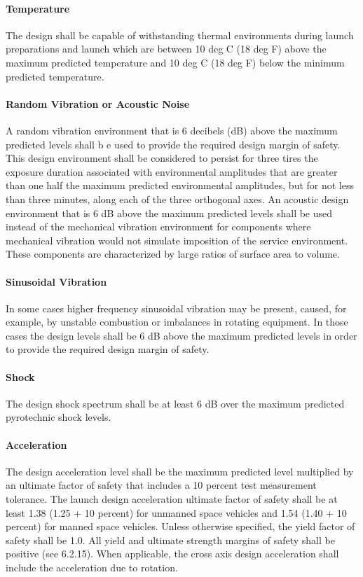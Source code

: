\documentclass[12pt]{article}
\begin{document}
\paragraph{Temperature} %
The design shall be capable of withstanding thermal environments during launch preparations and launch which are between 10 deg C (18 deg F) above the maximum predicted temperature and 10 deg C (18 deg F) below the minimum predicted temperature.

\paragraph{Random Vibration or Acoustic Noise} %
A random vibration environment that is 6 decibels (dB) above the maximum predicted levels shall b e used to provide the required design margin of safety. 
This design environment shall be considered to persist for three tires the exposure duration associated with environmental amplitudes that are greater than one half the maximum predicted environmental amplitudes, but for not less than three minutes, along each of the three orthogonal axes. 
An acoustic design environment that is 6 dB above the maximum predicted levels shall be used instead of the mechanical vibration environment for components where mechanical vibration would not simulate imposition of the service environment. 
These components are characterized by large ratios of surface area to volume.

\paragraph{Sinusoidal Vibration} %
In some cases higher frequency sinusoidal vibration may be present, caused, for example, by unstable combustion or imbalances in rotating equipment. 
In those cases the design levels shall be 6 dB above the maximum predicted levels in order to provide the required design margin of safety.

\paragraph{Shock} %
The design shock spectrum shall be at least 6 dB over the maximum predicted pyrotechnic shock levels.

\paragraph{Acceleration} %
The design acceleration level shall be the maximum predicted level multiplied by an ultimate factor of safety that includes a 10 percent test measurement tolerance. 
The launch design acceleration ultimate factor of safety shall be at least 1.38 (1.25 + 10 percent) for unmanned space vehicles and 1.54 (1.40 + 10 percent) for manned space vehicles. 
Unless otherwise specified, the yield factor of safety shall be 1.0. 
All yield and ultimate strength margins of safety shall be positive (see 6.2.15). 
When applicable, the cross axis design acceleration shall include the acceleration due to rotation.
\end{document}
